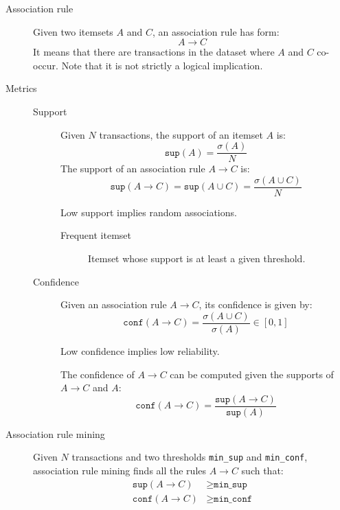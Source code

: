 \begin{description}
        \item[Association rule] 
        Given two itemsets $A$ and $C$, an association rule has form:
        \[ A \rightarrow C \]
        It means that there are transactions in the dataset where $A$ and $C$ co-occur. 
        Note that it is not strictly a logical implication.

    \item[Metrics] \phantom{}
        \begin{description}
            \item[Support] 
            Given $N$ transactions, the support of an itemset $A$ is:
            \[ \texttt{sup}(A) = \frac{\sigma(A)}{N} \]
            The support of an association rule $A \rightarrow C$ is:
            \[ \texttt{sup}(A \rightarrow C) = \texttt{sup}(A \cup C) = \frac{\sigma(A \cup C)}{N} \]

            Low support implies random associations.

            \begin{description}
                \item[Frequent itemset] 
                    Itemset whose support is at least a given threshold.
            \end{description}
    
        \item[Confidence] 
            Given an association rule $A \rightarrow C$, its confidence is given by:
            \[ \texttt{conf}(A \rightarrow C) = \frac{\sigma(A \cup C)}{\sigma(A)} \in [0, 1] \]

            Low confidence implies low reliability.

            \begin{theorem}
                The confidence of $A \rightarrow C$ can be computed given the supports of $A \rightarrow C$ and $A$:
                \[ \texttt{conf}(A \rightarrow C) = \frac{\texttt{sup}(A \rightarrow C)}{\texttt{sup}(A)} \]
            \end{theorem}
    \end{description}

    \item[Association rule mining] 
        Given $N$ transactions and two thresholds \texttt{min\_sup} and \texttt{min\_conf},
        association rule mining finds all the rules $A \rightarrow C$ such that:
        \[ \begin{split}
            \texttt{sup}(A \rightarrow C) &\geq \texttt{min\_sup} \\
            \texttt{conf}(A \rightarrow C) &\geq \texttt{min\_conf}
        \end{split} \]


\end{description}
